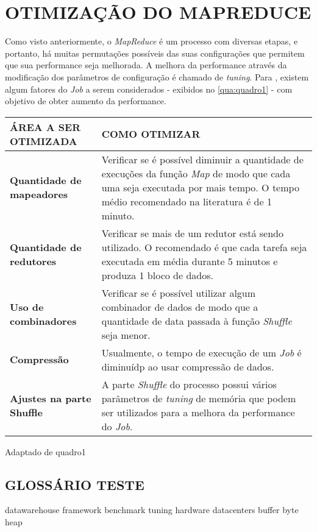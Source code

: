 \chapter{OTIMIZAÇÃO DO MAPREDUCE} \label{cha:otimizacaomapreduce}

Como visto anteriormente, o \textit{MapReduce} é um processo com diversas etapas, e portanto, há muitas permutações possíveis das suas configurações que permitem que sua performance seja melhorada. A melhora da performance através da modificação dos parâmetros de configuração é chamado de \textit{tuning}. Para \textcite{HadoopBook15}, existem algum fatores do \textit{Job} a serem considerados - exibidos no \autoref{qua:quadro1} - com objetivo de obter aumento da performance.

{\footnotesize
  \centering
  \begin{tabular}{|p{50mm}|p{100mm}|}\hline
    \textbf{ÁREA A SER OTIMIZADA}     & \textbf{COMO OTIMIZAR}                                                                                                                                                                       \\\hline
    \textbf{Quantidade de mapeadores} & Verificar se é possível diminuir a quantidade de execuções da função \textit{Map} de modo que cada uma seja executada por mais tempo. O tempo médio recomendado na literatura é de 1 minuto. \\\hline
    \textbf{Quantidade de redutores}  & Verificar se mais de um redutor está sendo utilizado. O recomendado é que cada tarefa seja executada em média durante 5 minutos e produza 1 bloco de dados.                                  \\\hline
    \textbf{Uso de combinadores}      & Verificar se é possível utilizar algum combinador de dados de modo que a quantidade de data passada à função \textit{Shuffle} seja menor.                                                    \\\hline
    \textbf{Compressão}               & Usualmente, o tempo de execução de um \textit{Job} é diminuídp ao usar compressão de dados.                                                                                                  \\\hline
    \textbf{Ajustes na parte Shuffle} & A parte \textit{Shuffle} do processo possui vários parâmetros de \textit{tuning} de memória que podem ser utilizados para a melhora da performance do \textit{Job}.                          \\\hline
  \end{tabular}}
{Adaptado de \cite{HadoopBook15}}{quadro1}{}{}





\section{GLOSSÁRIO TESTE}
\gls{datawarehouse} \gls{framework} \gls{benchmark} \gls{tuning} \gls{hardware} \gls{datacenters} \gls{buffer} \gls{byte} \gls{heap}